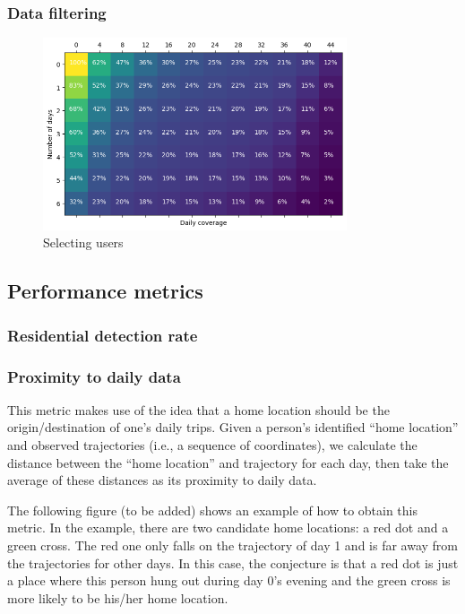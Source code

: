 \documentclass[pdflatex,sn-mathphys,lineno]{sn-jnl}%
\theoremstyle{thmstyleone}%
\theoremstyle{thmstyletwo}%
\theoremstyle{thmstylethree}%
\begin{document}
\subsubsection{Data filtering}
\begin{figure}[ht]
    \centering
    \includegraphics[width=0.8\textwidth]{figures/Selecting users.png}
    \caption{Selecting users}
    \label{fig:my_label2}
\end{figure}

\subsection{Performance metrics}

\subsubsection{Residential detection rate}

\subsubsection{Proximity to daily data}
This metric makes use of the idea that a home location should be the origin/destination of one’s daily trips. Given a person’s identified “home location” and observed trajectories (i.e., a sequence of coordinates), we calculate the distance between the “home location” and trajectory  for each day, then take the average of these distances as its proximity to daily data.

The following figure (to be added) shows an example of how to obtain this metric. In the example, there are two candidate home locations: a red dot and a green cross.  The red one only falls on the trajectory of day 1 and is far away from the trajectories for other days. In this case, the conjecture is that a red dot is just a place where this person hung out during day 0’s evening and the green cross is more likely to be his/her home location.
\end{document}
